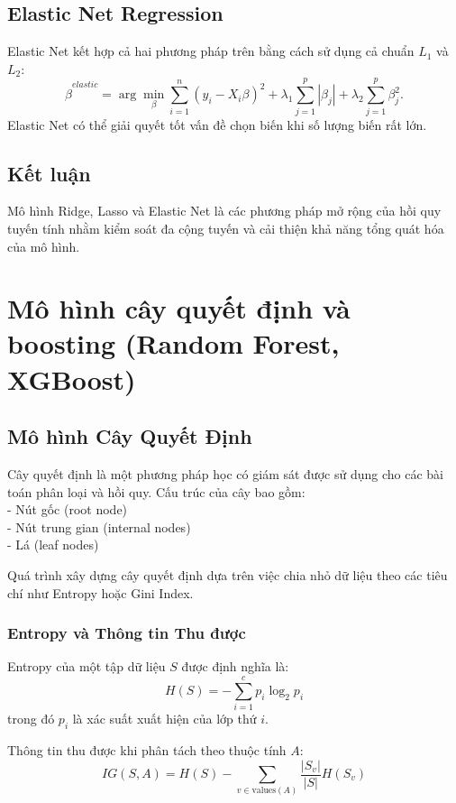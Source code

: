 \subsection{Elastic Net Regression}
Elastic Net kết hợp cả hai phương pháp trên bằng cách sử dụng cả chuẩn $L_1$ và $L_2$:
\begin{equation}
    \hat{\beta}^{elastic} = \arg\min_\beta \sum_{i=1}^{n} (y_i - X_i \beta)^2 + \lambda_1 \sum_{j=1}^{p} |\beta_j| + \lambda_2 \sum_{j=1}^{p} \beta_j^2.
\end{equation}
Elastic Net có thể giải quyết tốt vấn đề chọn biến khi số lượng biến rất lớn.

\subsection{Kết luận}
Mô hình Ridge, Lasso và Elastic Net là các phương pháp mở rộng của hồi quy tuyến tính nhằm kiểm soát đa cộng tuyến và cải thiện khả năng tổng quát hóa của mô hình.



\section{Mô hình cây quyết định và boosting (Random Forest, XGBoost)}
\subsection{Mô hình Cây Quyết Định}

Cây quyết định là một phương pháp học có giám sát được sử dụng cho các bài toán phân loại và hồi quy. Cấu trúc của cây bao gồm: \\
- Nút gốc (root node) \\
- Nút trung gian (internal nodes) \\
- Lá (leaf nodes)

Quá trình xây dựng cây quyết định dựa trên việc chia nhỏ dữ liệu theo các tiêu chí như Entropy hoặc Gini Index.

\subsubsection{Entropy và Thông tin Thu được}
Entropy của một tập dữ liệu $S$ được định nghĩa là:
\begin{equation}
    H(S) = - \sum_{i=1}^{c} p_i \log_2 p_i
\end{equation}
trong đó $p_i$ là xác suất xuất hiện của lớp thứ $i$.

Thông tin thu được khi phân tách theo thuộc tính $A$:
\begin{equation}
    IG(S, A) = H(S) - \sum_{v \in \text{values}(A)} \frac{|S_v|}{|S|} H(S_v)
\end{equation}

